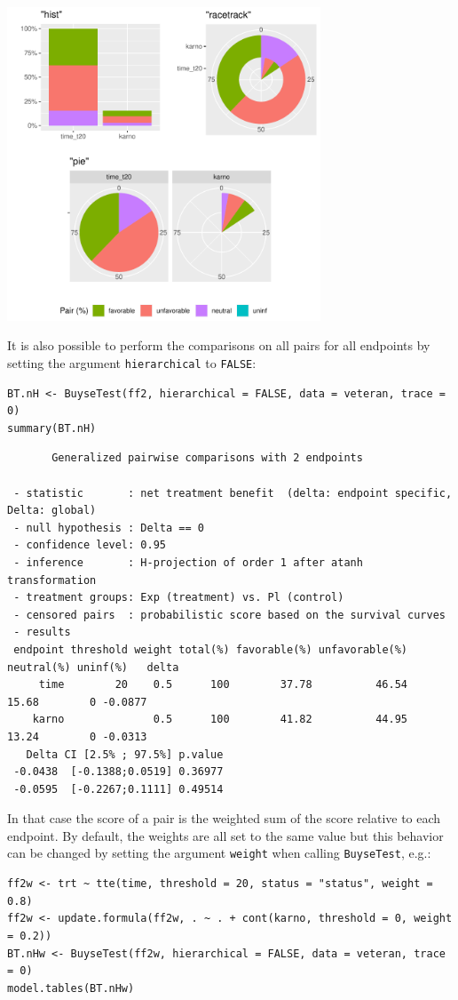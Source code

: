 \documentclass[12pt]{article}
\begin{document}
\begin{center}
\includegraphics[trim={0 0 0 0},width=0.7\textwidth]{./figures/plot-BuyseTest.pdf}
\end{center}


\bigskip

It is also possible to perform the comparisons on all pairs for all
endpoints by setting the argument \texttt{hierarchical} to \texttt{FALSE}:
\lstset{language=r,label= ,caption= ,captionpos=b,numbers=none}
\begin{lstlisting}
BT.nH <- BuyseTest(ff2, hierarchical = FALSE, data = veteran, trace = 0)
summary(BT.nH)
\end{lstlisting}

\begin{verbatim}
       Generalized pairwise comparisons with 2 endpoints

 - statistic       : net treatment benefit  (delta: endpoint specific, Delta: global) 
 - null hypothesis : Delta == 0 
 - confidence level: 0.95 
 - inference       : H-projection of order 1 after atanh transformation 
 - treatment groups: Exp (treatment) vs. Pl (control) 
 - censored pairs  : probabilistic score based on the survival curves
 - results
 endpoint threshold weight total(%) favorable(%) unfavorable(%) neutral(%) uninf(%)   delta
     time        20    0.5      100        37.78          46.54      15.68        0 -0.0877
    karno              0.5      100        41.82          44.95      13.24        0 -0.0313
   Delta CI [2.5% ; 97.5%] p.value 
 -0.0438  [-0.1388;0.0519] 0.36977 
 -0.0595  [-0.2267;0.1111] 0.49514
\end{verbatim}

In that case the score of a pair is the weighted sum of the score
relative to each endpoint. By default, the weights are all set to the
same value but this behavior can be changed by setting the argument
\texttt{weight} when calling \texttt{BuyseTest}, e.g.:
\lstset{language=r,label= ,caption= ,captionpos=b,numbers=none}
\begin{lstlisting}
ff2w <- trt ~ tte(time, threshold = 20, status = "status", weight = 0.8)
ff2w <- update.formula(ff2w, . ~ . + cont(karno, threshold = 0, weight = 0.2))
BT.nHw <- BuyseTest(ff2w, hierarchical = FALSE, data = veteran, trace = 0)
model.tables(BT.nHw)
\end{lstlisting}
\end{document}
